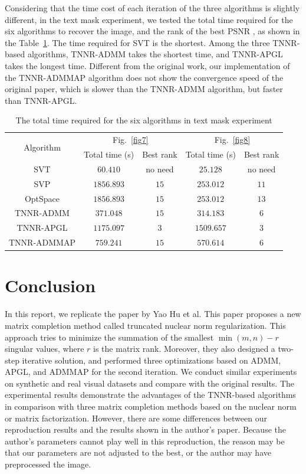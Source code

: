 \documentclass{article}
\begin{document}
{Considering that the time cost of each iteration of the three algorithms is slightly different, in the text mask experiment, we tested the total time required for the six algorithms to recover the image, and the rank of the best PSNR , as shown in the Table~\ref{t3}. The time required for SVT is the shortest. Among the three TNNR-based algorithms, TNNR-ADMM takes the shortest time, and TNNR-APGL takes the longest time. Different from the original work, our implementation of the TNNR-ADMMAP algorithm does not show the convergence speed of the original paper, which is slower than the TNNR-ADMM algorithm, but faster than TNNR-APGL.

\begin{table}
	\caption{The total time required for the six algorithms in text mask experiment}
	\label{t3}
	\centering
	\renewcommand{\arraystretch}{1.25} 
	\begin{tabular}{ccccc}
		\toprule
		\multirow{2}{*}{Algorithm}  & \multicolumn{2}{c}{Fig.~\ref{fig7}} & \multicolumn{2}{c}{Fig.~\ref{fig8}} \\
		\cmidrule(r){2-3} \cmidrule(r){4-5} 
		& Total time (s) & Best rank & Total time (s) & Best rank \\
		\midrule
		SVT & $60.410$ & no need &   $25.128$ &  no need \\
		SVP & $1856.893$ & $15$ & $253.012$ & $11$ \\
		OptSpace & $1856.893$ & $15$ & $253.012$ & $13$ \\
		TNNR-ADMM &  $371.048$ & $15$ & $314.183$ & $6$\\
		TNNR-APGL & $1175.097$ & $3$ & $1509.657$ & $3$\\
		TNNR-ADMMAP & $759.241$ & $15$ & $570.614$ & $6$\\
 		\bottomrule
	\end{tabular}
\end{table}

\section{Conclusion}
\label{s5}
In this report, we replicate the paper by Yao Hu et al. This paper proposes a new matrix completion method called truncated nuclear
norm regularization. This approach tries to minimize the summation of the smallest $\min (m,n)-r$ singular values, where $r$ is the matrix rank. 
Moreover, they also designed a two-step iterative solution, and performed three optimizations based on ADMM, APGL, and ADMMAP for the second iteration. We conduct similar experiments on synthetic and real visual datasets and compare with the original results. The experimental results demonstrate the advantages of the TNNR-based algorithms in comparison with
three matrix completion methods based on the nuclear norm or matrix factorization. However, there are some differences between our reproduction results and the results shown in the author's paper. Because the author's parameters cannot play well in this reproduction, the reason may be that our parameters are not adjusted to the best, or the author may have preprocessed the image.



}
\end{document}
